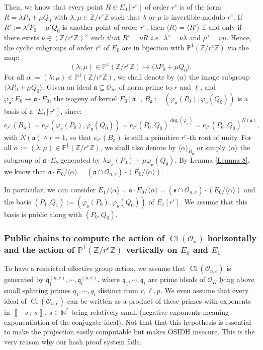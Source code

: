 \documentclass[a4paper,10pt,notitlepage]{report}
\theoremstyle{definition}
\theoremstyle{plain}
\theoremstyle{definition}
\newcommand{\ie}{\emph{i.e.}\ }
\newcommand{\N}{\mathbb{N}}
\newcommand{\Z}{\mathbb{Z}}
\newcommand{\mO}{\mathcal{O}}
\renewcommand{\i}[2]{\left\llbracket #1~;~#2\right\rrbracket}
\renewcommand{\(}{\left(}
\renewcommand{\)}{\right)}
\renewcommand{\P}{\mathbb{P}}
\newcommand{\mf}[1]{\mathfrak{#1}}
\DeclareMathOperator{\Cl}{Cl}
\begin{document}
Then, we know that every point $R\in E_0[r^e]$ of order $r^e$ is of the form $R=\lambda P_0+\mu Q_0$ with $\lambda,\mu\in\Z/r^e\Z$ such that $\lambda$ or $\mu$ is invertible modulo $r^e$.  If $R':=\lambda'P_0+\mu'Q_0$ is another point of order $r^e$, then $\langle R\rangle=\langle R'\rangle$ if and only if there exists $\nu\in(\Z/r^e\Z)^\times$ such that $R'=\nu R$ \ie  $\lambda'=\nu\lambda$ and $\mu'=\nu\mu$. Hence, the cyclic subgroups of order $r^e$ of $E_0$ are in bijection with $\P^1(\Z/r^e\Z)$ via the map:
\[(\lambda:\mu)\in\P^1(\Z/r^e\Z)\longmapsto \langle \lambda P_0+\mu Q_0\rangle.\]
For all $\alpha:=(\lambda:\mu)\in\P^1(\Z/r^e\Z)$, we shall denote by $\langle\alpha\rangle$ the image subgroup $\langle \lambda P_0+\mu Q_0\rangle$. Given an ideal $\mf{a}\subseteq \mO_n$, of norm prime to $r$ and $\ell$, and $\varphi_{\mf{a}}: E_0\longrightarrow \mf{a}\cdot E_0$, the isogeny of kernel $E_0[\mf{a}]$, $B_{\mf{a}}:=(\varphi_{\mf{a}}(P_0), \varphi_{\mf{a}}(Q_0))$ is a basis of $\mf{a}\cdot E_0[r^e]$, since:
\[e_{r^e}(B_{\mf{a}})=e_{r^e}(\varphi_{\mf{a}}(P_0), \varphi_{\mf{a}}(Q_0))=e_{r^e}(P_0,Q_0)^{\deg(\varphi_{\mf{a}})}=e_{r^e}(P_0,Q_0)^{N(\mf{a})},\]
with $N(\mf{a})\wedge r=1$, so that $e_{r^e}(B_{\mf{a}})$ is still a primitive $r^e$-th root of unity.  For all $\alpha:=(\lambda:\mu)\in\P^1(\Z/r^e\Z)$, we shall also denote by $\langle \alpha\rangle_{B_{\mf{a}}}$ or simply $\langle \alpha\rangle$ the subgroup of $\mf{a}\cdot E_b$ generated by $\lambda\varphi_{\mf{a}}(P_0)+\mu\varphi_{\mf{a}}(Q_0)$. By Lemma \ref{Lemma 8}, we know that $\mf{a}\cdot E_0/\langle\alpha\rangle=(\mf{a}\cap\mO_{n,e})\cdot(E_0/\langle\alpha\rangle)$. 

In particular, we can consider $E_1/\langle\alpha\rangle=\mf{s}\cdot E_0/\langle\alpha\rangle=(\mf{s}\cap\mO_{n,e})\cdot(E_0/\langle\alpha\rangle)$ and the basis $(P_1,Q_1):=(\varphi_{\mf{s}}(P_0), \varphi_{\mf{s}}(Q_0))$ of $E_1[r^e]$. We assume that this basis is public along with $(P_0,Q_0)$. 

\subsubsection{Public chains to compute the action of $\Cl(\mO_n)$ horizontally and the action of $\P^1(\Z/r^e\Z)$ vertically on $E_0$ and $E_1$}

To have a restricted effective group action, we assume that $\Cl(\mO_{n,e})$ is generated by $\mf{q}_1^{(n,e)}, \cdots, \mf{q}_t^{(n,e)}$, where $\mf{q}_1, \cdots, \mf{q}_t$ are prime ideals of $\mO_K$ lying above small splitting primes $q_1, \cdots, q_t$ distinct from $r,\ell,p$. We even assume that every ideal of $\Cl(\mO_{n,e})$ can be written as a product of these primes with exponents in $\i{-s}{s}$, $s\in\N^*$ being relatively small (negative exponents meaning exponentiation of the conjugate ideal). Not that that this hypothesis is essential to make the projection easily computable but makes OSIDH insecure. This is the very reason why our hash proof system fails.
\end{document}
